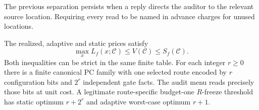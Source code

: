 The previous separation persists when a reply directs the auditor to the relevant source location. Requiring every read to be named in advance charges for unused locations.

\begin{theorem}\label{thm:t09}

The realized, adaptive and static prices satisfy
\[
 \max_x L_f(x;\mathcal C)\le V(\mathcal C)\le S_f(\mathcal C).
\]
Both inequalities can be strict in the same finite table. For each integer \(r\ge0\) there is a finite canonical PC family with one selected route encoded by \(r\) configuration bits and \(2^r\) independent gate facts. The audit menu reads precisely those bits at unit cost. A legitimate route-specific budget-one \(R\)-freeze threshold has static optimum \(r+2^r\) and adaptive worst-case optimum \(r+1\).

\end{theorem}

